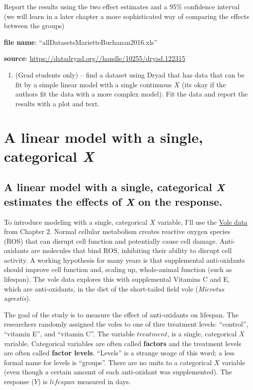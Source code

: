 \documentclass[]{book}
\providecommand{\tightlist}{%
  \setlength{\itemsep}{0pt}\setlength{\parskip}{0pt}}
\begin{document}
Report the results using the two effect estimates and a 95\% confidence
interval (we will learn in a later chapter a more sophisticated way of
comparing the effects between the groups)

\textbf{file name}: ``allDatasetsMarietteBuchanan2016.xls''

\textbf{source}: \url{https://datadryad.org//handle/10255/dryad.122315}

\begin{enumerate}
\def\labelenumi{\arabic{enumi}.}
\setcounter{enumi}{1}
\tightlist
\item
  (Grad students only) -- find a dataset using Dryad that has data that
  can be fit by a simple linear model with a single continuous \(X\)
  (its okay if the authors fit the data with a more complex model). Fit
  the data and report the results with a plot and text.
\end{enumerate}

\chapter{\texorpdfstring{A linear model with a single, categorical
\emph{X}}{A linear model with a single, categorical X}}\label{a-linear-model-with-a-single-categorical-x}

\section{\texorpdfstring{A linear model with a single, categorical
\emph{X} estimates the effects of \emph{X} on the
response.}{A linear model with a single, categorical X estimates the effects of X on the response.}}\label{a-linear-model-with-a-single-categorical-x-estimates-the-effects-of-x-on-the-response.}

To introduce modeling with a single, categorical \(X\) variable, I'll
use the \protect\hyperlink{vole-data}{Vole data} from Chapter 2. Normal
cellular metabolism creates reactive oxygen species (ROS) that can
disrupt cell function and potentially cause cell damage. Anti-oxidants
are molecules that bind ROS, inhibiting their ability to disrupt cell
activity. A working hypothesis for many years is that supplemental
anti-oxidants should improve cell function and, scaling up, whole-animal
function (such as lifespan). The vole data explores this with
supplemental Vitamins C and E, which are anti-oxidants, in the diet of
the short-tailed field vole (\emph{Microtus agrestis}).

The goal of the study is to measure the effect of anti-oxidants on
lifespan. The researchers randomly assigned the voles to one of thre
treatment levels: ``control'', ``vitamin E'', and ``vitamin C''. The
variable \(treatment\), is a single, categorical \(X\) variable.
Categorical variables are often called \textbf{factors} and the
treatment levels are often called \textbf{factor levels}. ``Levels'' is
a strange usage of this word; a less formal name for levels is
``groups''. There are no units to a categorical \(X\) variable (even
though a certain amount of each anti-oxidant was supplemented). The
response (\(Y\)) is \(lifespan\) measured in days.
\end{document}

